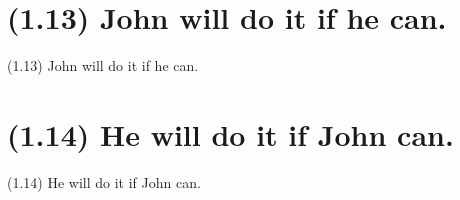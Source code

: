 \documentclass{article}
\begin{document}
\clearpage

%
%

\section*{(1.13) John will do it if he can.}

\bigbreak
\begin{enumerate*}
\item[(1.13)] John will do it if he can.
\end{enumerate*}
\bigbreak

\bigbreak
\begin{minipage}{\textwidth}
\end{minipage}
\bigbreak

\clearpage

%
%

\section*{(1.14) He will do it if John can.}

\bigbreak
\begin{enumerate*}
\item[(1.14)] He will do it if John can.
\end{enumerate*}
\bigbreak

\bigbreak
\begin{minipage}{\textwidth}
\end{minipage}
\bigbreak
\end{document}
